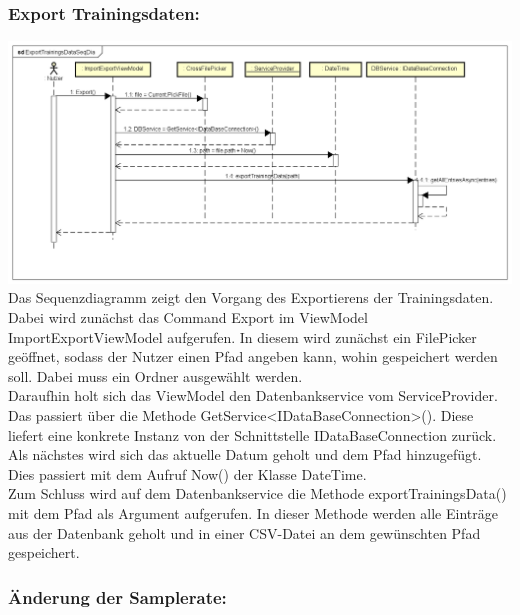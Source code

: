 \documentclass[a4paper,12pt]{article}
\begin{document}
\subsubsection{Export Trainingsdaten:}
\includegraphics[width=1.1\textwidth]{./Diagramme/TrainingsDatenExport_Sequenz.png}\\

Das Sequenzdiagramm zeigt den Vorgang des Exportierens der Trainingsdaten. 
Dabei wird zunächst das Command Export im ViewModel ImportExportViewModel aufgerufen. In diesem wird zunächst ein FilePicker geöffnet, sodass der Nutzer einen Pfad angeben kann, wohin gespeichert werden soll. 
Dabei muss ein Ordner ausgewählt werden. \\
Daraufhin holt sich das ViewModel den Datenbankservice vom ServiceProvider. Das passiert über die Methode GetService<IDataBaseConnection>(). Diese liefert eine konkrete Instanz von der Schnittstelle IDataBaseConnection zurück.
Als nächstes wird sich das aktuelle Datum geholt und dem Pfad hinzugefügt. Dies passiert mit dem Aufruf Now() der Klasse DateTime.\\
Zum Schluss wird auf dem Datenbankservice die Methode exportTrainingsData() mit dem Pfad als Argument aufgerufen. In dieser Methode werden alle Einträge aus der Datenbank geholt und in einer \gls{CSV}-Datei an dem gewünschten Pfad gespeichert.\\

\subsubsection{Änderung der Samplerate:}
\end{document}
